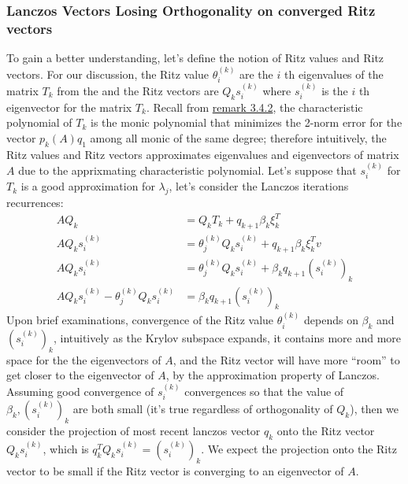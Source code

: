 \documentclass[]{article}
\theoremstyle{definition}
\begin{document}
        \subsubsection{Lanczos Vectors Losing Orthogonality on converged Ritz vectors}
            To gain a better understanding, let's define the notion of Ritz values and Ritz vectors. For our discussion, the Ritz value $\theta_i^{(k)}$ are the $i$ th eigenvalues of the matrix $T_k$ from the and the Ritz vectors are $Q_ks_{i}^{(k)}$ where $s_i^{(k)}$ is the $i$ th eigenvector for the matrix $T_k$. Recall from \hyperref[remark:Minimal_Polynomial_from_Lanczos_Iterations]{remark 3.4.2}, the characteristic polynomial of $T_k$ is the monic polynomial that minimizes the 2-norm error for the vector $p_k(A)q_1$ among all monic of the same degree; therefore intuitively, the Ritz values and Ritz vectors approximates eigenvalues and eigenvectors of matrix $A$ due to the apprixmating characteristic polynomial. Let's suppose that $s_i^{(k)}$ for $T_k$ is a good approximation for $\lambda_j$, let's consider the Lanczos iterations recurrences: 
            \begin{align}
                AQ_k &= Q_k T_k + q_{k + 1}\beta_k\xi_k^T
                \\
                AQ_ks_i^{(k)} &= \theta_j^{(k)} Q_k s_i^{(k)} + q_{k + 1}\beta_k \xi_k^Tv
                \\
                AQ_ks_i^{(k)} &= \theta_j^{(k)} Q_k s_i^{(k)} + \beta_kq_{k + 1}(s_i^{(k)})_k
                \\
                AQ_ks_i^{(k)} - \theta_j^{(k)} Q_k s_i^{(k)} &=   \beta_kq_{k + 1}(s_i^{(k)})_k
            \end{align}
            Upon brief examinations, convergence of the Ritz value $\theta_{i}^{(k)}$ depends on $\beta_k$ and $(s_i^{(k)})_k$, intuitively as the Krylov subspace expands, it contains more and more space for the the eigenvectors of $A$, and the Ritz vector will have more ``room'' to get closer to the eigenvector of $A$, by the approximation property of Lanczos. Assuming good convergence of $s_i^{(k)}$ convergences so that the value of $\beta_k, (s_i^{(k)})_k$ are both small (it's true regardless of orthogonality of $Q_k$), then we consider the projection of most recent lanczos vector $q_k$ onto the Ritz vector $Q_ks_i^{(k)}$, which is $q_k^TQ_ks_i^{(k)} = (s_i^{(k)})_k$. We expect the projection onto the Ritz vector to be small if the Ritz vector is converging to an eigenvector of $A$.  
            \par
\end{document}
